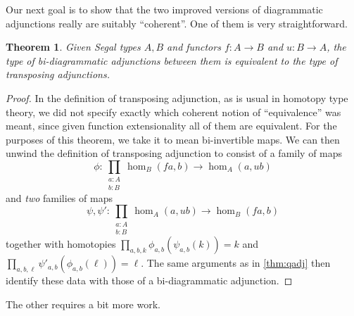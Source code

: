 \documentclass[12pt]{amsart}
\theoremstyle{plain}
\newtheorem{thm}{Theorem}[section]
\theoremstyle{definition}
\theoremstyle{remark}
\numberwithin{equation}{section}
\begin{document}
Our next goal is to show that the two improved versions of diagrammatic adjunctions really are suitably ``coherent''.
One of them is very straightforward.

\begin{thm}\label{thm:bda}
  Given Segal types $A,B$ and functors $f:A\to B$ and $u:B\to A$, the type of bi-diagrammatic adjunctions between them is equivalent to the type of transposing adjunctions.
\end{thm}
\begin{proof}
  In the definition of transposing adjunction, as is usual in homotopy type theory, we did not specify exactly which coherent notion of ``equivalence'' was meant, since given function extensionality all of them are equivalent.
  For the purposes of this theorem, we take it to mean bi-invertible maps.
  We can then unwind the definition of transposing adjunction to consist of a family of maps
  \[ \phi : \prod_{\substack{a:A\\ b:B}} \hom_B(fa,b) \to \hom_A(a,ub) \]
  and \emph{two} families of maps
  \[ \psi,\psi' : \prod_{\substack{a:A\\ b:B}} \hom_A(a,ub) \to \hom_B(fa,b) \]
  together with homotopies $\prod_{a,b,k} \phi_{a,b}(\psi_{a,b}(k)) = k$ and $\prod_{a,b,\ell} \psi'_{a,b}(\phi_{a,b}(\ell)) = \ell$.
  The same arguments as in \cref{thm:qadj} then identify these data with those of a bi-diagrammatic adjunction.
\end{proof}

The other requires a bit more work.
\end{document}
